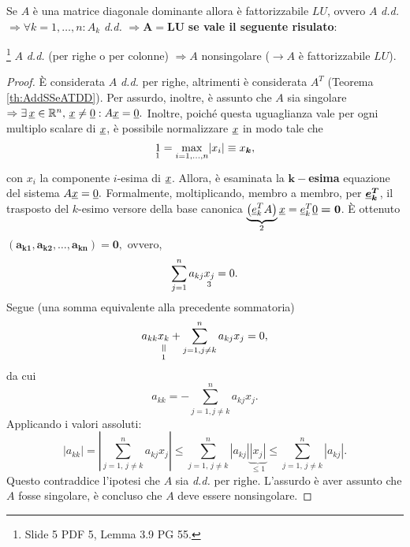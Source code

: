 Se $A$ è una matrice diagonale dominante allora è fattorizzabile $LU$, ovvero $A$ \textit{d.d.} $\Rightarrow\forall k=1,\hdots,n:A_k$ \textit{d.d.} $\Rightarrow \boldsymbol{A=LU}$ \textbf{se vale il seguente risulato}:
\begin{theorem}\label{th:matrice_diagonale_dominante_nonsingolare}\footnote{Slide 5 PDF 5, Lemma 3.9 PG 55.}
    $A$ \textit{d.d.} (per righe o per colonne) $\Rightarrow A$ nonsingolare ($\rightarrow A$ è fattorizzabile $LU$).
\end{theorem}
\begin{proof}
    È considerata $A$ \textit{d.d.} per righe, altrimenti è considerata $A^T$ (Teorema \ref{th:AddSSeATDD}). Per assurdo, inoltre, è assunto che $A$ sia singolare $\Rightarrow\exists\,\uline x\in\mathbb R^n,\, \uline x\neq\uline 0: A\uline x=\uline 0.$ Inoltre, poiché questa uguaglianza vale per ogni multiplo scalare di $\uline x$, è possibile normalizzare $\uline x$ in modo tale che 
    \begin{equation}\label{eq:normX}
        \underset{\footnotemark}{1} = \underset{i=1,\hdots,n}{\max}|x_i|\equiv x_{\boldsymbol k},
    \end{equation}
    con $x_i$ la componente $i$-esima di $\uline x$. Allora, è esaminata la $\boldsymbol{k-}$\textbf{esima} equazione del sistema $A\uline x=\uline 0.$ Formalmente, moltiplicando, membro a membro, per $\boldsymbol{\uline e_k^T}$, il trasposto del $k$-esimo versore della base canonica $\underbrace{\left(\uline e_k^T A\right)}_{\footnotemark}\uline x=\uline e_k^T\uline 0\boldsymbol{=0}$.
    È ottenuto $\boldsymbol{(a_{k1}, a_{k2},\hdots, a_{kn})=0},$ ovvero,
    \begin{equation*}
        \sum_{j=1}^n a_{kj}\underset{\footnotemark}{x_j}=0.
    \end{equation*}
    Segue (una somma equivalente alla precedente sommatoria)
    \begin{equation*}
        a_{kk}\equalto{x_k}{1} +  \sum_{j=1, j\neq k}^n a_{kj}x_j=0,
    \end{equation*}
    da cui
    \begin{equation*}
        a_{kk}= -\sum_{j=1, j\neq k}^n a_{kj}x_j.
    \end{equation*}
    Applicando i valori assoluti:
    \begin{equation*}
        |a_{kk}|=\left|\sum_{j=1,\, j\neq k}^n a_{kj}x_j\right|\leq \sum_{j=1,\, j\neq k}^n |a_{kj}|\underbrace{|x_j|}_{\leq 1}\leq \sum_{j=1,\, j\neq k}^n |a_{kj}|.
    \end{equation*}
    Questo contraddice l'ipotesi che $A$ sia \textit{d.d.} per righe. L'assurdo è aver assunto che $A$ fosse singolare, è concluso che $A$ deve essere nonsingolare.
\end{proof}

